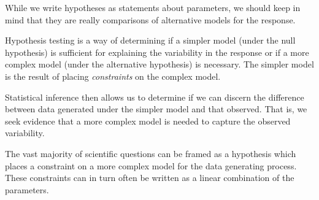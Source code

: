 \documentclass[
  letterpaper,
  DIV=11,
  numbers=noendperiod]{scrreprt}
\theoremstyle{definition}
\theoremstyle{definition}
\theoremstyle{remark}
\begin{document}
While we write hypotheses as statements about parameters, we should keep
in mind that they are really comparisons of alternative models for the
response.

\begin{tcolorbox}[enhanced jigsaw, left=2mm, toprule=.15mm, arc=.35mm, breakable, opacitybacktitle=0.6, opacityback=0, rightrule=.15mm, colbacktitle=quarto-callout-tip-color!10!white, coltitle=black, leftrule=.75mm, toptitle=1mm, colframe=quarto-callout-tip-color-frame, titlerule=0mm, title=\textcolor{quarto-callout-tip-color}{\faLightbulb}\hspace{0.5em}{Big Idea}, bottomrule=.15mm, colback=white, bottomtitle=1mm]

Hypothesis testing is a way of determining if a simpler model (under the
null hypothesis) is sufficient for explaining the variability in the
response or if a more complex model (under the alternative hypothesis)
is necessary. The simpler model is the result of placing
\emph{constraints} on the complex model.

Statistical inference then allows us to determine if we can discern the
difference between data generated under the simpler model and that
observed. That is, we seek evidence that a more complex model is needed
to capture the observed variability.

\end{tcolorbox}

The vast majority of scientific questions can be framed as a hypothesis
which places a constraint on a more complex model for the data
generating process. These constraints can in turn often be written as a
linear combination of the parameters.
\end{document}
